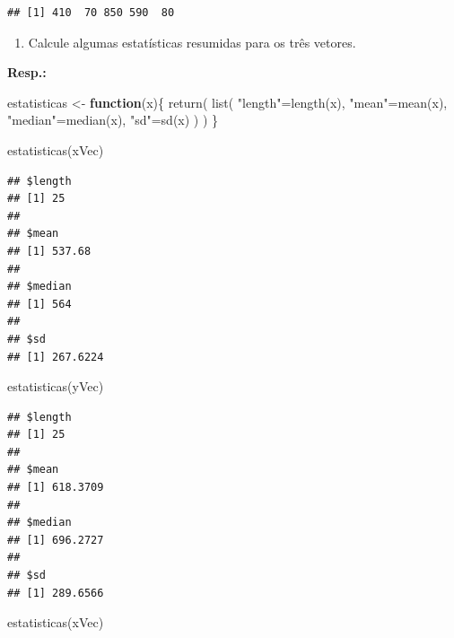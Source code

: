 \documentclass[
]{article}
\newenvironment{Shaded}{\begin{snugshade}}{\end{snugshade}}
\newcommand{\ControlFlowTok}[1]{\textcolor[rgb]{0.13,0.29,0.53}{\textbf{#1}}}
\newcommand{\FunctionTok}[1]{\textcolor[rgb]{0.00,0.00,0.00}{#1}}
\newcommand{\NormalTok}[1]{#1}
\newcommand{\OtherTok}[1]{\textcolor[rgb]{0.56,0.35,0.01}{#1}}
\newcommand{\StringTok}[1]{\textcolor[rgb]{0.31,0.60,0.02}{#1}}
\providecommand{\tightlist}{%
  \setlength{\itemsep}{0pt}\setlength{\parskip}{0pt}}
\begin{document}
\begin{verbatim}
## [1] 410  70 850 590  80
\end{verbatim}

\begin{enumerate}
\def\labelenumi{\arabic{enumi}.}
\setcounter{enumi}{2}
\tightlist
\item
  Calcule algumas estatísticas resumidas para os três vetores.
\end{enumerate}

\textbf{Resp.:}

\begin{Shaded}
\begin{Highlighting}[]
\NormalTok{estatisticas }\OtherTok{\textless{}{-}} \ControlFlowTok{function}\NormalTok{(x)\{}
  \FunctionTok{return}\NormalTok{(}
    \FunctionTok{list}\NormalTok{(}
      \StringTok{"length"}\OtherTok{=}\FunctionTok{length}\NormalTok{(x),}
      \StringTok{"mean"}\OtherTok{=}\FunctionTok{mean}\NormalTok{(x),}
      \StringTok{"median"}\OtherTok{=}\FunctionTok{median}\NormalTok{(x),}
      \StringTok{"sd"}\OtherTok{=}\FunctionTok{sd}\NormalTok{(x)}
\NormalTok{    )}
\NormalTok{  )}
\NormalTok{\}}
\end{Highlighting}
\end{Shaded}

\begin{Shaded}
\begin{Highlighting}[]
\FunctionTok{estatisticas}\NormalTok{(xVec)}
\end{Highlighting}
\end{Shaded}

\begin{verbatim}
## $length
## [1] 25
## 
## $mean
## [1] 537.68
## 
## $median
## [1] 564
## 
## $sd
## [1] 267.6224
\end{verbatim}

\begin{Shaded}
\begin{Highlighting}[]
\FunctionTok{estatisticas}\NormalTok{(yVec)}
\end{Highlighting}
\end{Shaded}

\begin{verbatim}
## $length
## [1] 25
## 
## $mean
## [1] 618.3709
## 
## $median
## [1] 696.2727
## 
## $sd
## [1] 289.6566
\end{verbatim}

\begin{Shaded}
\begin{Highlighting}[]
\FunctionTok{estatisticas}\NormalTok{(xVec)}
\end{Highlighting}
\end{Shaded}
\end{document}
